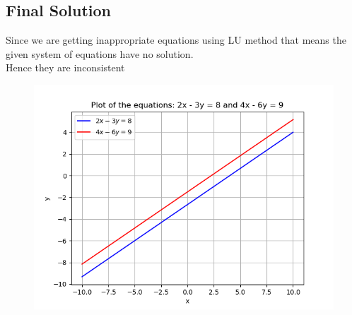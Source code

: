 \documentclass[journal]{IEEEtran}
\begin{document}
	\subsection*{Final Solution}
	Since we are getting inappropriate equations using LU method that means the given system of equations have no solution.\\
    Hence they are inconsistent

\begin{figure}[!ht]
    \centering
    \includegraphics[width=\columnwidth]{figs/Figure_1.png}
    \caption{}
\end{figure}
\end{document}
